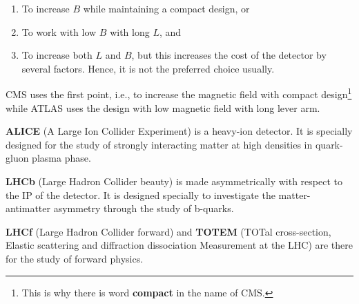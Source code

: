 \begin{enumerate}
	\item To increase $B$ while maintaining a compact design, or
	\item To work with low $B$ with long $L$, and
	\item To increase both $L$ and $B$, but this increases the cost of the detector by several factors. Hence, it is not the preferred choice usually.
\end{enumerate}

CMS uses the first point, i.e., to increase the magnetic field with compact design\footnote{This is why there is word {\textbf{compact}} in the name of CMS.} while ATLAS uses the design with low magnetic field with long lever arm.


{\textbf{ALICE}} (A Large Ion Collider Experiment) is a heavy-ion detector. It is specially designed for the study of strongly interacting matter at high densities in quark-gluon plasma phase.

{\textbf{LHCb}} (Large Hadron Collider beauty) is made asymmetrically with respect to the IP of the detector. It is designed specially to investigate the matter-antimatter asymmetry through the study of b-quarks.

{\textbf{LHCf}} (Large Hadron Collider forward) and {\textbf{TOTEM}} (TOTal cross-section, Elastic scattering and diffraction dissociation Measurement at the LHC) are there for the study of forward physics.

